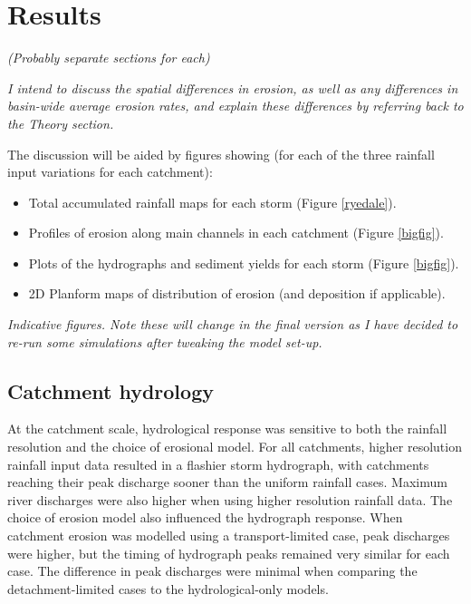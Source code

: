 \documentclass[12pt,oneside,PhD]{muthesis}
\begin{document}
%

\section{Results}

\textit{(Probably separate sections for each)}

\textit{I intend to discuss the spatial differences in erosion, as well as any differences in basin-wide average erosion rates, and explain these differences by referring back to the Theory section.}

The discussion will be aided by figures showing (for each of the three rainfall input variations for each catchment):

\begin{itemize}
\item Total accumulated rainfall maps for each storm (Figure \ref{ryedale}). 
\item Profiles of erosion along main channels in each catchment (Figure \ref{bigfig}).
\item Plots of the hydrographs and sediment yields for each storm (Figure \ref{bigfig}).
\item 2D Planform maps of distribution of erosion (and deposition if applicable).
\end{itemize}

\textit{Indicative figures. Note these will change in the final version as I have decided to re-run some simulations after tweaking the model set-up.}

\subsection{Catchment hydrology}


At the catchment scale, hydrological response was sensitive to both the rainfall resolution and the choice of erosional model. For all catchments, higher resolution rainfall input data resulted in a flashier storm hydrograph, with catchments reaching their peak discharge sooner than the uniform rainfall cases. Maximum river discharges were also higher when using higher resolution rainfall data. The choice of erosion model also influenced the hydrograph response. When catchment erosion was modelled using a transport-limited case, peak discharges were higher, but the timing of hydrograph peaks remained very similar for each case. The difference in peak discharges were minimal when comparing the detachment-limited cases to the hydrological-only models.
\end{document}
